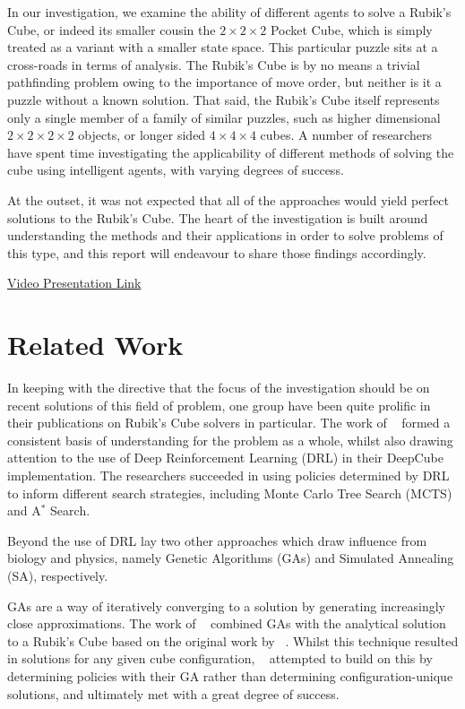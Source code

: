 \documentclass[UKenglish]{svproc}
\begin{document}
In our investigation, we examine the ability of different agents to solve a Rubik's Cube, or indeed its smaller cousin the $2\times 2\times 2$ Pocket Cube, which is simply treated as a variant with a smaller state space.
This particular puzzle sits at a cross-roads in terms of analysis. The Rubik's Cube is by no means a trivial pathfinding problem owing to the importance of move order, but neither is it a puzzle without a known solution. That said, the Rubik's Cube itself represents only a single member of a family of similar puzzles, such as higher dimensional $2\times 2\times 2\times 2$ objects, or longer sided $4\times 4\times 4$ cubes. A number of researchers have spent time investigating the applicability of different methods of solving the cube using intelligent agents, with varying degrees of success.

At the outset, it was not expected that all of the approaches would yield perfect solutions to the Rubik's Cube. The heart of the investigation is built around understanding the methods and their applications in order to solve problems of this type, and this report will endeavour to share those findings accordingly.

\centerline{
\href{https://tcdud-my.sharepoint.com/:v:/g/personal/wosulliv_tcd_ie/EfZp76zjybdOkXOPufEgXxcB1N7eRqVvDfTOixktLc8bgA?e=lQsjbX}{Video Presentation Link}}

\section{Related Work}
In keeping with the directive that the focus of the investigation should be on recent solutions of this field of problem, one group have been quite prolific in their publications on Rubik's Cube solvers in particular. The work of \citeauthor{agostinelli2019solving}~\autocite{agostinelli2019solving, mcaleer2019solving, mcaleer2018solving} formed a consistent basis of understanding for the problem as a whole, whilst also drawing attention to the use of Deep Reinforcement Learning (DRL) in their DeepCube implementation. The researchers succeeded in using policies determined by DRL to inform different search strategies, including Monte Carlo Tree Search (MCTS) and A$^\ast$ Search.

Beyond the use of DRL lay two other approaches which draw influence from biology and physics, namely Genetic Algorithms (GAs) and Simulated Annealing (SA), respectively.

GAs are a way of iteratively converging to a solution by generating increasingly close approximations. The work of \citeauthor{10.1007/978-3-642-12239-2_9}~\autocite{10.1007/978-3-642-12239-2_9} combined GAs with the analytical solution to a Rubik's Cube based on the original work by \citeauthor{Thistlethwaite}~\autocite{Thistlethwaite}. Whilst this technique resulted in solutions for any given cube configuration, \citeauthor{10.1145/2908812.2908887}~\autocite{10.1145/2908812.2908887} attempted to build on this by determining policies with their GA rather than determining configuration-unique solutions, and ultimately met with a great degree of success.
\end{document}
